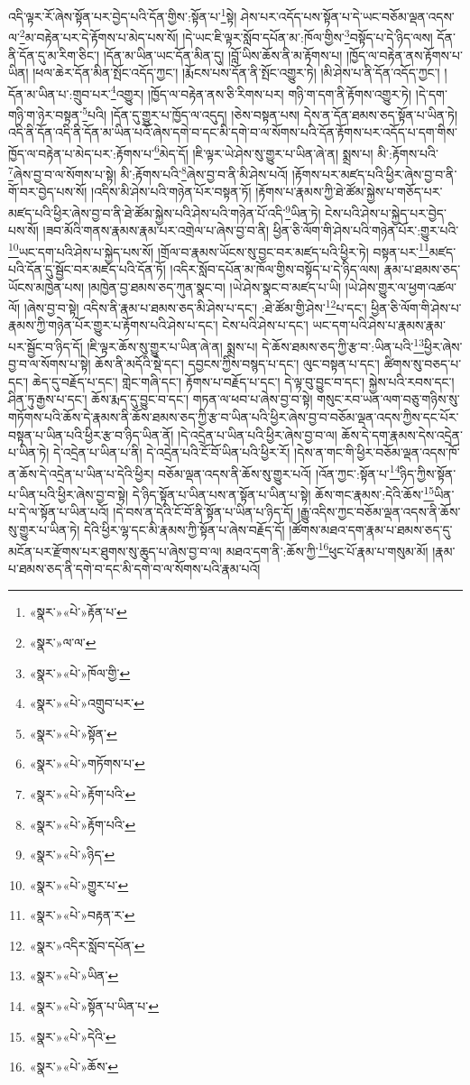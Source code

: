 འདི་ལྟར་རོ་ཞེས་སྟོན་པར་བྱེད་པའི་དོན་གྱིས་:སྟོན་པ་\footnote{«སྣར་»«པེ་»རྟོན་པ་}སྟེ། ཤེས་པར་འདོད་པས་སྟོན་པ་དེ་ཡང་བཅོམ་ལྡན་འདས་ལ་\footnote{«སྣར་»ལ་ལ་}མ་བརྟེན་པར་དེ་རྟོགས་པ་མེད་པས་སོ། །དེ་ཡང་ཇི་ལྟར་སློབ་དཔོན་མ་:ཁོལ་གྱིས་\footnote{«སྣར་»«པེ་»ཁོལ་གྱི་}བསྟོད་པ་དེ་ཉིད་ལས། དོན་ནི་དོན་དུ་མ་རིག་ཅིང་། །དོན་མ་ཡིན་ཡང་དོན་མིན་དུ། །བློ་ཡིས་ཆོས་ནི་མ་རྟོགས་པ། །ཁྱོད་ལ་བརྟེན་ནས་རྟོགས་པ་ཡིན། །ཕལ་ཆེར་དོན་མིན་སྤོང་འདོད་ཀྱང་། །རྨོངས་པས་དོན་ནི་སྤོང་འགྱུར་ཏེ། །མི་ཤེས་པ་ནི་དོན་འདོད་ཀྱང་། །དོན་མ་ཡིན་པ་:གྲུབ་པར་\footnote{«སྣར་»«པེ་»འགྲུབ་པར་}འགྱུར། །ཁྱོད་ལ་བརྟེན་ནས་ཅི་རིགས་པར། གཉི་ག་དག་ནི་རྟོགས་འགྱུར་ཏེ། །དེ་དག་གཉི་ག་ཉེར་བསྟན་\footnote{«སྣར་»«པེ་»སྟོན་}པའི། །དོན་དུ་གྱུར་པ་ཁྱོད་ལ་འདུད། །ཅེས་བསྟན་པས། དེས་ན་དོན་ཐམས་ཅད་སྟོན་པ་ཡིན་ཏེ། འདི་ནི་དོན་འདི་ནི་དོན་མ་ཡིན་པའོ་ཞེས་དགེ་བ་དང་མི་དགེ་བ་ལ་སོགས་པའི་དོན་རྟོགས་པར་འདོད་པ་དག་གིས་ཁྱོད་ལ་བརྟེན་པ་མེད་པར་:རྟོགས་པ་\footnote{«སྣར་»«པེ་»གཏོགས་པ་}མེད་དོ། །ཇི་ལྟར་ཡེ་ཤེས་སུ་གྱུར་པ་ཡིན་ཞེ་ན། སྨྲས་པ། མི་:རྟོགས་པའི་\footnote{«སྣར་»«པེ་»རྟོག་པའི་}ཞེས་བྱ་བ་ལ་སོགས་པ་སྟེ། མི་:རྟོགས་པའི་\footnote{«སྣར་»«པེ་»རྟོག་པའི་}ཞེས་བྱ་བ་ནི་མི་ཤེས་པའོ། །རྟོགས་པར་མཛད་པའི་ཕྱིར་ཞེས་བྱ་བ་ནི་གོ་བར་བྱེད་པས་སོ། །འདིས་མི་ཤེས་པའི་གཉེན་པོར་བསྟན་ཏོ། །རྟོགས་པ་རྣམས་ཀྱི་ཐེ་ཚོམ་སྐྱེས་པ་གཅོད་པར་མཛད་པའི་ཕྱིར་ཞེས་བྱ་བ་ནི་ཐེ་ཚོམ་སྐྱེས་པའི་ཤེས་པའི་གཉེན་པོ་འདི་\footnote{«སྣར་»«པེ་»ཉིད་}ཡིན་ཏེ། ངེས་པའི་ཤེས་པ་སྐྱེད་པར་བྱེད་པས་སོ། །ཟབ་མོའི་གནས་རྣམས་རྣམ་པར་འགྲེལ་པ་ཞེས་བྱ་བ་ནི། ཕྱིན་ཅི་ལོག་གི་ཤེས་པའི་གཉེན་པོར་:གྱུར་པའི་\footnote{«སྣར་»«པེ་»གྱུར་པ་}ཡང་དག་པའི་ཤེས་པ་སྐྱེད་པས་སོ། །གྲོལ་བ་རྣམས་ཡོངས་སུ་བྱང་བར་མཛད་པའི་ཕྱིར་ཏེ། བསྟན་པར་\footnote{«སྣར་»«པེ་»བརྟན་ར་}མཛད་པའི་དོན་དུ་སྦྱོང་བར་མཛད་པའི་དོན་ཏོ། །འདིར་སློབ་དཔོན་མ་ཁོལ་གྱིས་བསྟོད་པ་དེ་ཉིད་ལས། རྣམ་པ་ཐམས་ཅད་ཡོངས་མཁྱེན་པས། །མཁྱེན་བྱ་ཐམས་ཅད་ཀུན་སྣང་བ། །ཡེ་ཤེས་སྣང་བ་མཛད་པ་ཡི། །ཡེ་ཤེས་གྱུར་ལ་ཕྱག་འཚལ་ལོ། །ཞེས་བྱ་བ་སྟེ། འདིས་ནི་རྣམ་པ་ཐམས་ཅད་མི་ཤེས་པ་དང་། :ཐེ་ཚོམ་གྱི་ཤེས་\footnote{«སྣར་»འདིར་སློབ་དཔོན་}པ་དང་། ཕྱིན་ཅི་ལོག་གི་ཤེས་པ་རྣམས་ཀྱི་གཉེན་པོར་གྱུར་པ་རྟོགས་པའི་ཤེས་པ་དང་། ངེས་པའི་ཤེས་པ་དང་། ཡང་དག་པའི་ཤེས་པ་རྣམས་རྣམ་པར་སྦྱོང་བ་ཉིད་དོ། །ཇི་ལྟར་ཆོས་སུ་གྱུར་པ་ཡིན་ཞེ་ན། སྨྲས་པ། དེ་ཆོས་ཐམས་ཅད་ཀྱི་རྩ་བ་:ཡིན་པའི་\footnote{«སྣར་»«པེ་»ཡིན་}ཕྱིར་ཞེས་བྱ་བ་ལ་སོགས་པ་སྟེ། ཆོས་ནི་མདོའི་སྡེ་དང་། དབྱངས་ཀྱིས་བསྙད་པ་དང་། ལུང་བསྟན་པ་དང་། ཚིགས་སུ་བཅད་པ་དང་། ཆེད་དུ་བརྗོད་པ་དང་། གླེང་གཞི་དང་། རྟོགས་པ་བརྗོད་པ་དང་། དེ་ལྟ་བུ་བྱུང་བ་དང་། སྐྱེས་པའི་རབས་དང་། ཤིན་ཏུ་རྒྱས་པ་དང་། ཆོས་རྨད་དུ་བྱུང་བ་དང་། གཏན་ལ་ཕབ་པ་ཞེས་བྱ་བ་སྟེ། གསུང་རབ་ཡན་ལག་བཅུ་གཉིས་སུ་གཏོགས་པའི་ཆོས་དེ་རྣམས་ནི་ཆོས་ཐམས་ཅད་ཀྱི་རྩ་བ་ཡིན་པའི་ཕྱིར་ཞེས་བྱ་བ་བཅོམ་ལྡན་འདས་ཀྱིས་དང་པོར་བསྟན་པ་ཡིན་པའི་ཕྱིར་རྩ་བ་ཉིད་ཡིན་ནོ། །དེ་འདྲེན་པ་ཡིན་པའི་ཕྱིར་ཞེས་བྱ་བ་ལ། ཆོས་དེ་དག་རྣམས་དེས་འདྲེན་པ་ཡིན་ཏེ། དེ་འདྲེན་པ་ཡིན་པ་ནི། དེ་འདྲེན་པའི་ངོ་བོ་ཡིན་པའི་ཕྱིར་རོ། །དེས་ན་གང་གི་ཕྱིར་བཅོམ་ལྡན་འདས་ཁོ་ན་ཆོས་དེ་འདྲེན་པ་ཡིན་པ་དེའི་ཕྱིར། བཅོམ་ལྡན་འདས་ནི་ཆོས་སུ་གྱུར་པའོ། །འོན་ཀྱང་:སྟོན་པ་\footnote{«སྣར་»«པེ་»སྟོན་པ་ཡིན་པ་}ཉིད་ཀྱིས་སྟོན་པ་ཡིན་པའི་ཕྱིར་ཞེས་བྱ་བ་སྟེ། དེ་ཉིད་སྟོན་པ་ཡིན་པས་ན་སྟོན་པ་ཡིན་པ་སྟེ། ཆོས་གང་རྣམས་:དེའི་ཆོས་\footnote{«སྣར་»«པེ་»དེའི་}ཡིན་པ་དེ་ལ་སྟོན་པ་ཡིན་པའོ། །དེ་བས་ན་དེའི་ངོ་བོ་ནི་སྟོན་པ་ཡིན་པ་ཉིད་དོ། །རྒྱུ་འདིས་ཀྱང་བཅོམ་ལྡན་འདས་ནི་ཆོས་སུ་གྱུར་པ་ཡིན་ཏེ། དེའི་ཕྱིར་ལྷ་དང་མི་རྣམས་ཀྱི་སྟོན་པ་ཞེས་བརྗོད་དོ། །ཚོགས་མཐའ་དག་རྣམ་པ་ཐམས་ཅད་དུ་མངོན་པར་རྫོགས་པར་ཐུགས་སུ་ཆུད་པ་ཞེས་བྱ་བ་ལ། མཐའ་དག་ནི་:ཆོས་ཀྱི་\footnote{«སྣར་»«པེ་»ཆོས་}ཕུང་པོ་རྣམ་པ་གསུམ་མོ། །རྣམ་པ་ཐམས་ཅད་ནི་དགེ་བ་དང་མི་དགེ་བ་ལ་སོགས་པའི་རྣམ་པའོ། 